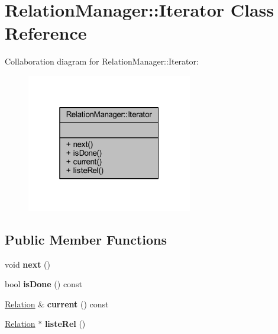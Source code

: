 \hypertarget{class_relation_manager_1_1_iterator}{}\section{Relation\+Manager\+:\+:Iterator Class Reference}
\label{class_relation_manager_1_1_iterator}


Collaboration diagram for Relation\+Manager\+:\+:Iterator\+:
\nopagebreak
\begin{figure}[H]
\begin{center}
\leavevmode
\includegraphics[width=205pt]{class_relation_manager_1_1_iterator__coll__graph}
\end{center}
\end{figure}
\subsection*{Public Member Functions}
\begin{DoxyCompactItemize}
\item 
\mbox{\label{class_relation_manager_1_1_iterator_a4deab2fdd2f7b70242ecbfab9d3d1552}} 
void {\bfseries next} ()
\item 
\mbox{\label{class_relation_manager_1_1_iterator_a5e9588417d8c6dc8ce1285612dff7840}} 
bool {\bfseries is\+Done} () const
\item 
\mbox{\label{class_relation_manager_1_1_iterator_ad3f5e514500480f65dc9b14d1aae358f}} 
\hyperlink{class_relation}{Relation} \& {\bfseries current} () const
\item 
\mbox{\label{class_relation_manager_1_1_iterator_a017175bf4f16360c5b2ee5d8fd534d22}} 
\hyperlink{class_relation}{Relation} $\ast$ {\bfseries liste\+Rel} ()
\end{DoxyCompactItemize}
